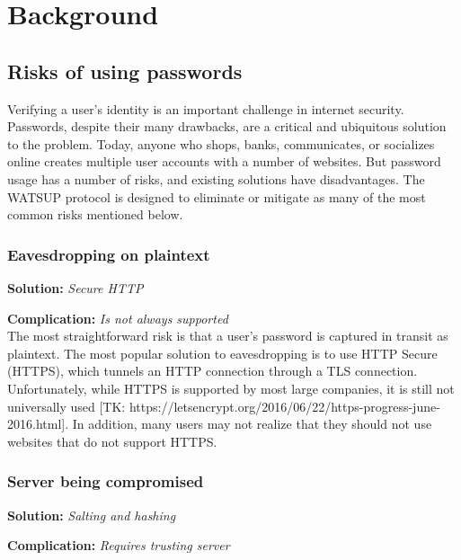 \section{Background}
\label{sec:background}

\subsection{Risks of using passwords}

Verifying a user's identity is an important challenge in internet security. Passwords, despite their many drawbacks, are a critical and ubiquitous solution to the problem. Today, anyone who shops, banks, communicates, or socializes online creates multiple user accounts with a number of websites. But password usage has a number of risks, and existing solutions have disadvantages. The WATSUP protocol is designed to eliminate or mitigate as many of the most common risks mentioned below.


\subsubsection{Eavesdropping on plaintext}

\textbf{Solution:} \emph{Secure HTTP}

\noindent\textbf{Complication:} \emph{Is not always supported}\\

\noindent The most straightforward risk is that a user's password is captured in transit as plaintext. The most popular solution to eavesdropping is to use HTTP Secure (HTTPS), which tunnels an HTTP connection through a TLS connection. Unfortunately, while HTTPS is supported by most large companies, it is still not universally used [TK: https://letsencrypt.org/2016/06/22/https-progress-june-2016.html]. In addition, many users may not realize that they should not use websites that do not support HTTPS.


\subsubsection{Server being compromised}

\textbf{Solution:} \emph{Salting and hashing}

\noindent\textbf{Complication:} \emph{Requires trusting server}\\

